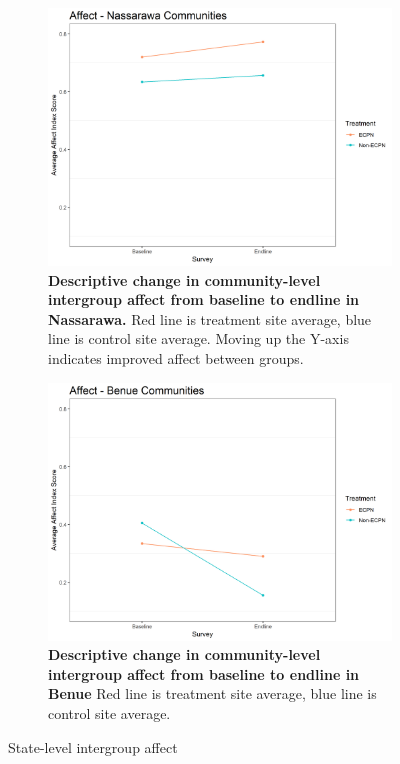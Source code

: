 \documentclass[11pt]{article}
\begin{document}
\begin{figure}[H]
    \begin{subfigure}[b]{.48\textwidth}
    \centering
        \includegraphics[width=\linewidth]{../../../figs/affectComm_plot_nas.png}
        \caption{\textbf{Descriptive change in community-level intergroup affect from baseline to endline in Nassarawa.} Red line is treatment site average, blue line is control site average.  Moving up the Y-axis indicates improved affect between groups.}
        \label{fig:affect_nas}
    \end{subfigure}
    \hfill
    \begin{subfigure}[b]{.48\textwidth}
    \centering
        \includegraphics[width=\linewidth]{../../../figs/affectComm_plot_ben.png}
        \caption{\textbf{Descriptive change in community-level intergroup affect from baseline to endline in Benue} Red line is treatment site average, blue line is control site average.}
        \label{fig:affect_ben}
    \end{subfigure}
    \caption{State-level intergroup affect}
\end{figure}
\end{document}
